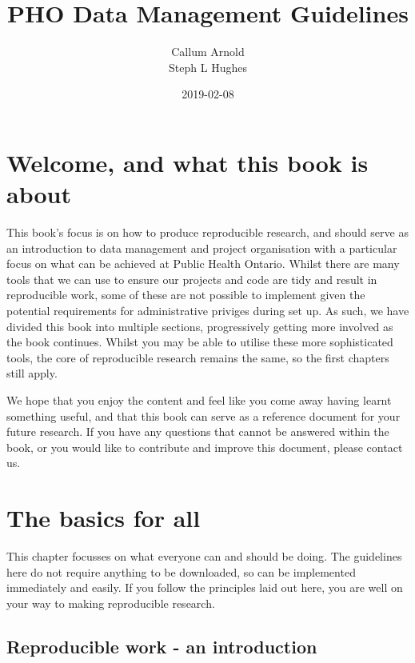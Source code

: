 \documentclass[]{book}
\title{PHO Data Management Guidelines}
\author{Callum Arnold \\ Steph L Hughes}
\date{2019-02-08}
\begin{document}
\maketitle

{
\setcounter{tocdepth}{1}
\tableofcontents
}
\hypertarget{welcome-and-what-this-book-is-about}{%
\chapter*{Welcome, and what this book is about}\label{welcome-and-what-this-book-is-about}}

This book's focus is on how to produce reproducible research, and should serve as an introduction to data management and project organisation with a particular focus on what can be achieved at Public Health Ontario. Whilst there are many tools that we can use to ensure our projects and code are tidy and result in reproducible work, some of these are not possible to implement given the potential requirements for administrative priviges during set up. As such, we have divided this book into multiple sections, progressively getting more involved as the book continues. Whilst you may be able to utilise these more sophisticated tools, the core of reproducible research remains the same, so the first chapters still apply.

We hope that you enjoy the content and feel like you come away having learnt something useful, and that this book can serve as a reference document for your future research. If you have any questions that cannot be answered within the book, or you would like to contribute and improve this document, please contact us.

\hypertarget{the-basics-for-all}{%
\chapter{The basics for all}\label{the-basics-for-all}}

This chapter focusses on what everyone can and should be doing. The guidelines here do not require anything to be downloaded, so can be implemented immediately and easily. If you follow the principles laid out here, you are well on your way to making reproducible research.

\hypertarget{reproducible-work---an-introduction}{%
\section{Reproducible work - an introduction}\label{reproducible-work---an-introduction}}
\end{document}
